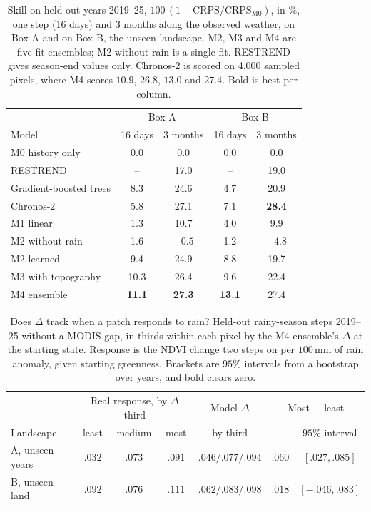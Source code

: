 \documentclass[letterpaper]{article} %
\begin{document}
\begin{table}[t]\centering\caption{Skill on held-out years 2019--25, $100\,(1-\mathrm{CRPS}/\mathrm{CRPS}_{\mathrm{M0}})$, in $\%$, one step (16 days) and 3 months along the observed weather, on Box A and on Box B, the unseen landscape. M2, M3 and M4 are five-fit ensembles; M2 without rain is a single fit. RESTREND gives season-end values only. Chronos-2 is scored on 4,000 sampled pixels, where M4 scores $10.9$, $26.8$, $13.0$ and $27.4$. Bold is best per column.}\label{tab:onestep}\footnotesize\setlength{\tabcolsep}{3pt}
\begin{tabular}{lcccc}\toprule
 & \multicolumn{2}{c}{Box A} & \multicolumn{2}{c}{Box B}\\
Model & 16 days & 3 months & 16 days & 3 months\\\midrule
M0 history only & 0.0 & 0.0 & 0.0 & 0.0\\
RESTREND & -- & 17.0 & -- & 19.0\\
Gradient-boosted trees & 8.3 & 24.6 & 4.7 & 20.9\\
Chronos-2 & 5.8 & 27.1 & 7.1 & \textbf{28.4}\\
M1 linear & 1.3 & 10.7 & 4.0 & 9.9\\
M2 without rain & 1.6 & $-0.5$ & 1.2 & $-4.8$\\
M2 learned & 9.4 & 24.9 & 8.8 & 19.7\\
M3 with topography & 10.3 & 26.4 & 9.6 & 22.4\\
M4 ensemble & \textbf{11.1} & \textbf{27.3} & \textbf{13.1} & 27.4\\
\bottomrule\end{tabular}\end{table}

\begin{table}[t]\centering\footnotesize\setlength{\tabcolsep}{3pt}
\caption{Does $\Delta$ track when a patch responds to rain? Held-out rainy-season steps 2019--25 without a MODIS gap, in thirds within each pixel by the M4 ensemble's $\Delta$ at the starting state. Response is the NDVI change two steps on per $100$\,mm of rain anomaly, given starting greenness. Brackets are $95\%$ intervals from a bootstrap over years, and bold clears zero.}\label{tab:greeks}
\begin{tabular}{lcccccc}\toprule
 & \multicolumn{3}{c}{Real response, by $\Delta$ third} & Model $\Delta$ & \multicolumn{2}{c}{Most $-$ least}\\
Landscape & least & medium & most & by third & & $95\%$ interval\\\midrule
A, unseen years & $.032$ & $.073$ & $.091$ & $.046/.077/.094$ & $\mathbf{.060}$ & $[.027, .085]$\\
B, unseen land & $.092$ & $.076$ & $.111$ & $.062/.083/.098$ & $.018$ & $[-.046, .083]$\\\bottomrule
\end{tabular}
\end{table}
\end{document}

